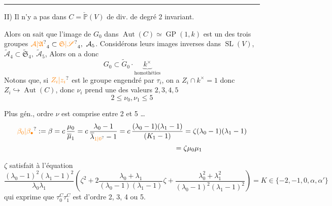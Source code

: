 \begin{center}\rule{1.1cm}{0.3pt}\end{center}

II) Il n'y a pas dans $C=\check{\mathbb P}(V)$ de div. de degré 2 invariant.

Alors on sait que l'image de $G_{0}$ dans $\operatorname{Aut}(C)\simeq \operatorname{GP}(1,k)$ est un des trois groupes $\unsure{\mathcal A|\mathfrak A}_4\subset \unsure{\mathfrak S|\mathscr S}_4,\ \mathcal A_5$. Considérons leurs images inverses dans $\operatorname{SL}(V)$, $\widetilde{\mathcal A}_4\subset\widetilde{\mathfrak S}_4,\ \widetilde{\mathcal A}_5$,  Alors on a donc
\[
G_0\subset\widetilde G_0\cdot\underbrace{k^\times}_{\text{homothéties}}
\]
Notons que, si $\unsure{Z_i|z_i}$  est le groupe engendré par $\tau_i$, on a $Z_i\cap k^\times=1$ donc $Z_i\hookrightarrow\operatorname{Aut}(C)$, donc $\nu_i$ prend une des valeurs $2,3,4,5$
\[
2\leq\nu_0,\nu_1\leq5
\]

 Plus gén.,    ordre $\nu$ est comprise entre 2 et 5 \ldots
\[
\begin{aligned}
\unsure{\beta_0|\beta_{\bullet}}:=\beta&=c\,\frac{\mu_0}{\overline{\mu}_1}
=c\,\frac{\lambda_0-1}{\overline{\lambda}_{\unsure{1|0}}-1}
=c\,\frac{(\lambda_0-1)(\lambda_1-1)}{(K_1-1)}
=\zeta(\lambda_0-1)(\lambda_1-1)\\
&\hspace{6cm}=\zeta\mu_0\mu_1
\end{aligned}
\]

$\zeta$ satisfait à l'équation
\[
\frac{(\lambda_0-1)^2(\lambda_1-1)^2}{\lambda_0\lambda_1}
\left(\zeta^2+2\frac{\lambda_0+\lambda_1}{(\lambda_0-1)(\lambda_1-1)}\zeta
+\frac{\lambda_0^2+\lambda_1^2}{(\lambda_0-1)^2(\lambda_1-1)^2}\right)
=K\in\{-2,-1,0,\alpha,\alpha'\}
\]
qui exprime que $\tau_0^{C}\tau_1^C$ est d'ordre 2, 3, 4 ou 5.

